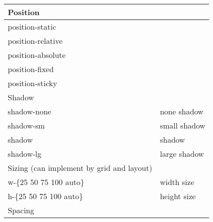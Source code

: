 \documentclass{article}
\begin{document}
\begin{longtable}{ll}
			Position                                    &                                                                                 \\ \hline
			position-static                             &                                                                                 \\
			position-relative                           &                                                                                 \\
			position-absolute                           &                                                                                 \\
			position-fixed                              &                                                                                 \\
			position-sticky                             &                                                                                 \\ \hline
			Shadow                                      &                                                                                 \\ \hline
			shadow-none                                 & none shadow                                                                     \\
			shadow-sm                                   & small shadow                                                                    \\
			shadow                                      & shadow                                                                          \\
			shadow-lg                                   & large shadow                                                                    \\ \hline
			Sizing (can implement by grid and layout)   &                                                                                 \\ \hline
			w-\{25 50 75 100 auto\}                     & width size                                                                      \\
			h-\{25 50 75 100 auto\}                     & height size                                                                     \\ \hline
			Spacing                                     &                                                                                 \\ \hline

\end{longtable}
\end{document}
